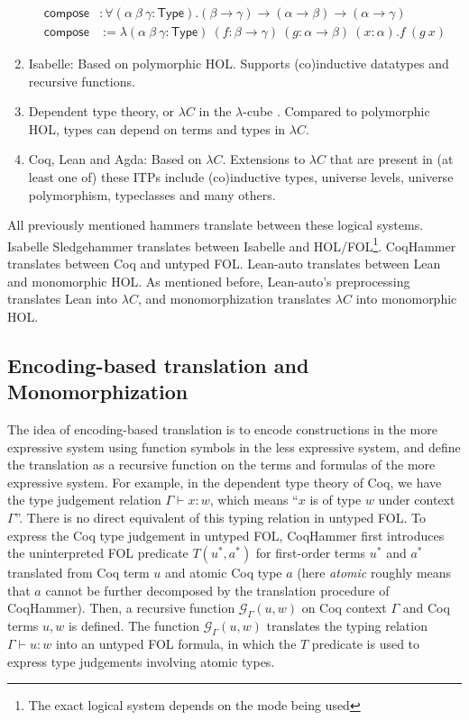 \begin{enumerate}
      $$\begin{aligned}
      \mathsf{compose} & : \forall (\alpha \ \beta \ \gamma : \mathsf{Type}). (\beta \to \gamma) \to (\alpha \to \beta) \to (\alpha \to \gamma) \\
      \mathsf{compose} & := \lambda (\alpha \ \beta \ \gamma : \mathsf{Type}) \ (f : \beta \to \gamma) \ (g : \alpha \to \beta) \ (x : \alpha). f \ (g \ x)
      \end{aligned}$$
    \item Isabelle: Based on polymorphic HOL. Supports (co)inductive datatypes and recursive functions.
    \item Dependent type theory, or $\lambda C$ in the $\lambda$-cube \cite{LambdaWithType}. Compared
      to polymorphic HOL, types can depend on terms and types in $\lambda C$.
    \item Coq, Lean and Agda: Based on $\lambda C$. Extensions to $\lambda C$ that are
      present in (at least one of) these ITPs include (co)inductive types, universe levels,
      universe polymorphism, typeclasses and many others.
  \end{enumerate}
  
  \noindent All previously mentioned hammers translate between these logical systems. Isabelle
  Sledgehammer translates between Isabelle and
  HOL/FOL\footnote{The exact logical system depends on the mode being used}.
  CoqHammer translates between Coq and untyped FOL. Lean-auto translates
  between Lean and monomorphic HOL. As mentioned before, Lean-auto's
  preprocessing translates Lean into $\lambda C$, and monomorphization
  translates $\lambda C$ into monomorphic HOL.

\subsection{Encoding-based translation and Monomorphization}\label{subencmon}

  The idea of encoding-based translation is to encode
  constructions in the more expressive system using function symbols in the less
  expressive system, and define the translation as a recursive function on the terms and formulas
  of the more expressive system. For example, in the dependent type theory of Coq,
  we have the type judgement relation $\Gamma \vdash x : w$, which means ``$x$ is of
  type $w$ under context $\Gamma$''. There is no direct equivalent of this
  typing relation in untyped FOL. To express the Coq type judgement in untyped FOL, 
  CoqHammer first introduces the uninterpreted FOL predicate $T(u^*, a^*)$ for
  first-order terms $u^*$ and $a^*$ translated from Coq term $u$ and atomic Coq type $a$
  (here \textit{atomic} roughly means that $a$ cannot be
  further decomposed by the translation procedure of CoqHammer). Then, a recursive function
  $\mathcal{G}_\Gamma(u, w)$ on Coq context $\Gamma$ and Coq terms $u, w$ is defined.
  The function $\mathcal{G}_\Gamma(u, w)$ translates the typing relation $\Gamma \vdash u : w$ into an untyped FOL formula,
  in which the $T$ predicate is used to express type judgements involving atomic types.
  
